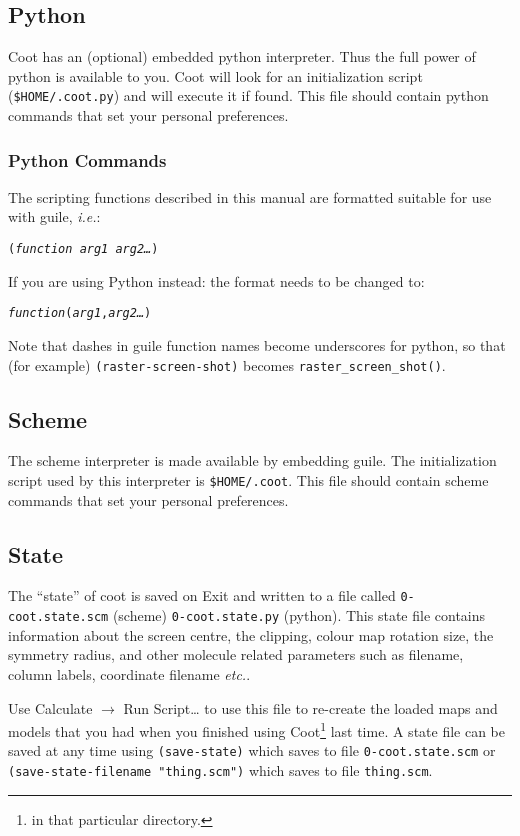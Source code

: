 \documentclass{book}
\begin{document}
\subsection{Python}
 Coot has an (optional) embedded python interpreter.
Thus the full power of python is available to you.  Coot will look for
an initialization script (\texttt{\$HOME/.coot.py}) and
will execute it if found.  This file should contain python commands
that set your personal preferences.


\subsubsection{Python Commands}
The scripting functions described in this manual are formatted
suitable for use with guile, \emph{i.e.}:

\texttt{(\emph{function} \emph{arg1} \emph{arg2\ldots})}

If you are using Python instead: the format needs to be changed to:

\texttt{\emph{function}(\emph{arg1},\emph{arg2\ldots})}

Note that dashes in guile function names become underscores for
python, so that (for example) \texttt{(raster-screen-shot)} becomes
\texttt{raster\_screen\_shot()}.


\subsection{Scheme}
%
 The scheme interpreter is made available by embedding
guile.  The initialization script used by this interpreter is
 
\texttt{\$HOME/.coot}.  This file should contain scheme commands that
set your personal preferences.


\subsection{State}
\label{sec:coot_state}
The ``state'' of coot is saved on Exit and written to a
file called \texttt{0-coot.state.scm} (scheme)
\texttt{0-coot.state.py} (python).   This
state file contains information about the screen centre, the
clipping, colour map rotation size, the symmetry radius, and other
molecule related parameters such as filename, column labels,
coordinate filename \emph{etc.}.

Use \textsf{Calculate $\rightarrow$ Run Script\ldots} to use this file
to re-create the loaded maps and models that you had when you finished
using Coot\footnote{in that particular directory.} last time.
A state file can be saved at any time using \texttt{(save-state)}
which saves to file \texttt{0-coot.state.scm} or
\texttt{(save-state-filename "thing.scm")} which saves to file
\texttt{thing.scm}.
\end{document}
